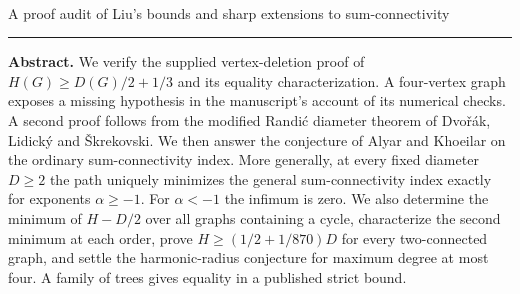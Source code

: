 \documentclass[11pt,a4paper]{article}
\begin{document}
\thispagestyle{plain}
\par
\vspace{9pt}
\\[5pt]
{\large A proof audit of Liu's bounds and sharp extensions to sum-connectivity}\par
\vspace{7pt}\par
\vspace{9pt}\hrule\vspace{12pt}
\noindent\textbf{Abstract.}
We verify the supplied vertex-deletion proof of $H(G)\ge D(G)/2+1/3$ and its equality characterization. A four-vertex graph exposes a missing hypothesis in the manuscript's account of its numerical checks. A second proof follows from the modified Randi\'c diameter theorem of Dvo\v r\'ak, Lidick\'y and \v Skrekovski. We then answer the conjecture of Alyar and Khoeilar on the ordinary sum-connectivity index. More generally, at every fixed diameter $D\ge2$ the path uniquely minimizes the general sum-connectivity index exactly for exponents $\alpha\ge-1$. For $\alpha<-1$ the infimum is zero. We also determine the minimum of $H-D/2$ over all graphs containing a cycle, characterize the second minimum at each order, prove $H\ge(1/2+1/870)D$ for every two-connected graph, and settle the harmonic-radius conjecture for maximum degree at most four. A family of trees gives equality in a published strict bound.
\end{document}
